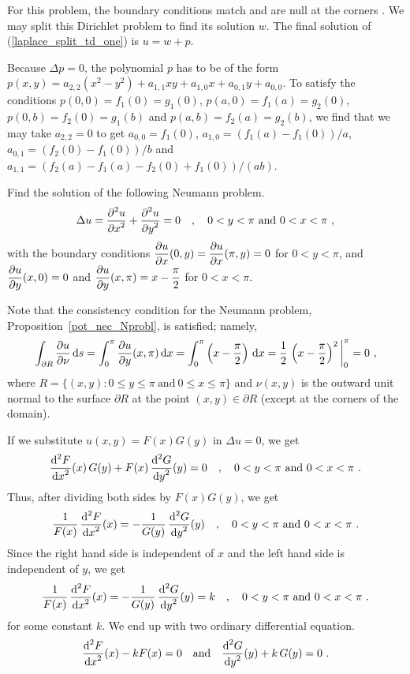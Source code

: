 \begin{rmk}
For this problem, the boundary conditions match and are null at the
corners .  We may split this Dirichlet problem to find its solution
$w$.  The final solution of (\ref{laplace_split_td_one}) is $u = w + p$.

Because $\Delta p = 0$, the polynomial $p$ has to be of the form
$p(x,y) = a_{2,2}(x^2-y^2) + a_{1,1}xy + a_{1,0}x + a_{0,1}y + a_{0,0}$.
To satisfy the conditions
$p(0,0) = f_1(0) = g_1(0)$, $p(a,0) = f_1(a) = g_2(0)$,
$p(0,b) = f_2(0) = g_1(b)$ and $p(a,b) = f_2(a) = g_2(b)$, we find
that we may take $a_{2,2} = 0$ to get
$a_{0,0} = f_1(0)$, $a_{1,0} = (f_1(a) - f_1(0))/a$,
$a_{0,1} = (f_2(0) - f_1(0))/b$ and
$a_{1,1} = (f_2(a) - f_1(a) -f_2(0) + f_1(0))/(ab)$.
\label{laplace_split_td}
\end{rmk}

\begin{egg}
Find the solution of the following Neumann problem.
\[
\Delta u = \frac{\displaystyle \partial^{2}{u}} {\displaystyle \partial x^{2}} + \frac{\displaystyle \partial^{2}{u}} {\displaystyle \partial y^{2}} = 0 \quad ,
\quad 0 < y < \pi \ \text{and} \ 0 < x < \pi \ ,
\]
with the boundary conditions
$\displaystyle \frac{\partial{u}}{\partial x}(0,y) = \frac{\partial{u}}{\partial x}(\pi,y) = 0$
for $0<y<\pi$, and
$\displaystyle \frac{\partial{u}}{\partial y}(x,0) =0$ and
$\displaystyle \frac{\partial{u}}{\partial y}(x,\pi) = x - \frac{\pi}{2}$
for $0<x<\pi$.

Note that the consistency condition for the Neumann problem,
Proposition~\ref{pot_nec_Nprobl}, is satisfied; namely,
\begin{equation} \label{laplace_spv_npc}
\int_{\partial R} \pdydx{u}{\nu} \dx{s} = \int_0^\pi \pdydx{u}{y}(x,\pi) \dx{x}
= \int_0^\pi \left(x-\frac{\pi}{2}\right)\dx{x}
= \frac{1}{2}\,\left( x - \frac{\pi}{2}\right)^2\bigg|_0^\pi = 0 \ ,
\end{equation}
where
$\displaystyle R = \{ (x,y) : 0 \leq y \leq \pi \ \text{and}
\ 0 \leq x \leq \pi\}$
and $\nu(x,y)$ is the outward unit normal to the surface $\partial R$
at the point $(x,y) \in \partial R$ (except at the corners of the domain).

If we substitute $u(x,y) = F(x)G(y)$ in $\Delta u = 0$, we get
\[
\frac{\displaystyle \mathrm{d}^{2}{F}} {\displaystyle \mathrm{d}{x}^{2}}(x)\,G(y) + F(x)\,\frac{\displaystyle \mathrm{d}^{2}{G}} {\displaystyle \mathrm{d}{y}^{2}}(y) = 0 \quad ,
\quad 0 < y < \pi \ \text{and} \ 0 < x < \pi \ .
\]
Thus, after dividing both sides by $F(x)G(y)$, we get
\[
\frac{1}{F(x)}\,\dydxn{F}{x}{2}(x) = -\frac{1}{G(y)}\,\dydxn{G}{y}{2}(y)
\quad , \quad 0 < y < \pi \ \text{and} \ 0 < x < \pi \ .
\]
Since the right hand side is independent of $x$ and the left hand side
is independent of $y$, we get
\[
\frac{1}{F(x)}\,\dydxn{F}{x}{2}(x) = -\frac{1}{G(y)}\,\dydxn{G}{y}{2}(y)
= k  \quad , \quad 0 < y < \pi \ \text{and} \ 0 < x < \pi \ .
\]
for some constant $k$.  We end up with two ordinary differential equation.
\begin{equation} \label{laplace_spv_egg1_ode}
\frac{\displaystyle \mathrm{d}^{2}{F}} {\displaystyle \mathrm{d}{x}^{2}}(x) -k F(x) = 0 \quad \text{and}
\quad \frac{\displaystyle \mathrm{d}^{2}{G}} {\displaystyle \mathrm{d}{y}^{2}}(y) + k\,G(y) = 0 \ .
\end{equation}


\end{egg}
